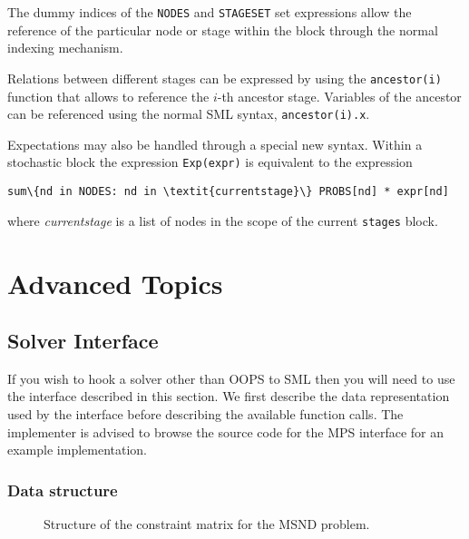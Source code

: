 \documentclass[10pt,a4paper]{report}
\begin{document}
The dummy indices of the {\tt NODES} and {\tt STAGESET} set expressions allow
the reference of the particular node or stage within the block through
the normal indexing mechanism.

Relations between different stages can be expressed by using the 
{\tt ancestor(i)} function that allows to reference the $i$-th ancestor
stage. Variables of the ancestor can be referenced using the normal SML syntax,
{\tt ancestor(i).x}.

Expectations may also be handled through a special new syntax. Within a
stochastic block the expression {\tt Exp(expr)} is equivalent to the expression
\begin{Verbatim}[commandchars=\\\{\}]
   sum\{nd in NODES: nd in \textit{currentstage}\} PROBS[nd] * expr[nd]
\end{Verbatim}
where \textit{currentstage} is a list of nodes in the scope
of the current {\tt stages} block.


\chapter{Advanced Topics}

\section{Solver Interface}
\label{interface}

If you wish to hook a solver other than OOPS to SML then you will need to use
the interface described in this section. We first describe the data
representation used by the interface before describing the available function
calls. The implementer is advised to browse the source code for the MPS
interface for an example implementation.

\subsection{Data structure}
\begin{figure}
   \caption{ \label{Iface eg}
      Structure of the constraint matrix for the MSND problem.
   }
   \begin{center}
   \end{center}
\end{figure}
\end{document}
